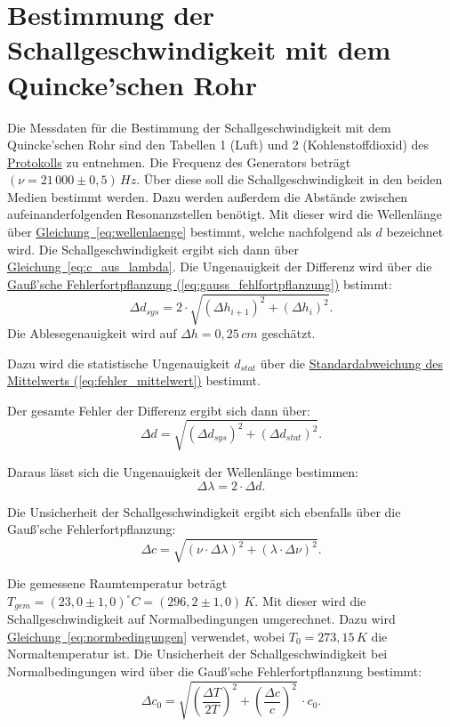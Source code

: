 \section{Bestimmung der Schallgeschwindigkeit mit dem Quincke'schen Rohr}
Die Messdaten für die Bestimmung der Schallgeschwindigkeit mit dem Quincke'schen Rohr sind den Tabellen 1 (Luft) und 2 (Kohlenstoffdioxid) des \hyperref[Protokoll]{Protokolls} zu entnehmen. Die Frequenz des Generators beträgt $(\nu = 21\,000 \pm 0,5)\,Hz$. Über diese soll die Schallgeschwindigkeit in den beiden Medien bestimmt werden. Dazu werden außerdem die Abstände zwischen aufeinanderfolgenden Resonanzstellen benötigt. Mit dieser wird die Wellenlänge über \hyperref[eq:wellenlaenge]{Gleichung~\ref*{eq:wellenlaenge}} bestimmt, welche nachfolgend als $d$ bezeichnet wird. Die Schallgeschwindigkeit ergibt sich dann über \hyperref[eq:c_aus_lambda]{Gleichung~\ref*{eq:c_aus_lambda}}. 
Die Ungenauigkeit der Differenz wird über die \hyperref[eq:gauss_fehlfortpflanzung]{Gauß'sche Fehlerfortpflanzung (\ref*{eq:gauss_fehlfortpflanzung})} bstimmt:
\begin{equation}
    \Delta d_{sys} = 2 \cdot \sqrt{(\Delta h_{i+1})^2 + (\Delta h_i)^2}.
\end{equation}
Die Ablesegenauigkeit wird auf $\Delta h = 0,25\,cm$ geschätzt.

Dazu wird die statistische Ungenauigkeit $d_{stat}$ über die \hyperref[eq:fehler_mittelwert]{Standardabweichung des Mittelwerts (\ref*{eq:fehler_mittelwert})} bestimmt.

Der gesamte Fehler der Differenz ergibt sich dann über:
\begin{equation}
    \Delta d = \sqrt{(\Delta d_{sys})^2 + (\Delta d_{stat})^2}.
\end{equation}

Daraus lässt sich die Ungenauigkeit der Wellenlänge bestimmen:
\begin{equation}
    \Delta \lambda = 2 \cdot \Delta d.
\end{equation}

Die Unsicherheit der Schallgeschwindigkeit ergibt sich ebenfalls über die Gauß'sche Fehlerfortpflanzung:
\begin{equation}
    \Delta c = \sqrt{(\nu \cdot \Delta \lambda )^2 + (\lambda \cdot \Delta \nu)^2}.  
\end{equation}

Die gemessene Raumtemperatur beträgt $T_{gem} = (23,0 \pm 1,0)^\circ C = (296,2 \pm 1,0)\,K$. Mit dieser wird die Schallgeschwindigkeit auf Normalbedingungen umgerechnet. Dazu wird \hyperref[eq:normbedingungen]{Gleichung~\ref*{eq:normbedingungen}} verwendet, wobei $T_0 = 273,15\,K$ die Normaltemperatur ist. Die Unsicherheit der Schallgeschwindigkeit bei Normalbedingungen wird über die Gauß'sche Fehlerfortpflanzung bestimmt:
\begin{equation}
    \Delta c_0 = \sqrt{\left( \frac{\Delta T}{2T} \right)^2 + \left(\frac{\Delta c}{c}\right)^2} \, \cdot c_0.
\end{equation}   


